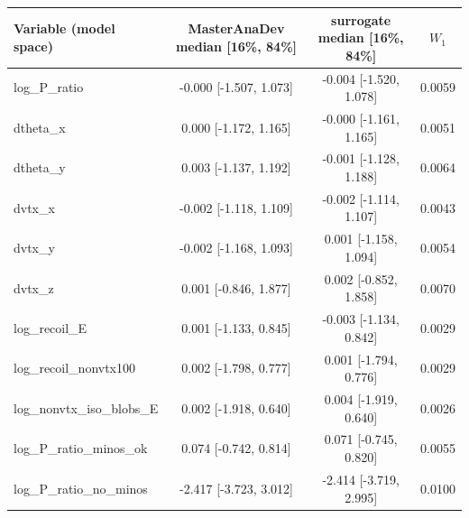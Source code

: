 \begin{tabular}{lccc}
\toprule
Variable (model space) & MasterAnaDev median [16\%, 84\%] & surrogate median [16\%, 84\%] & $W_1$ \\
\midrule
log\_P\_ratio & -0.000 [-1.507, 1.073] & -0.004 [-1.520, 1.078] & 0.0059 \\
dtheta\_x & 0.000 [-1.172, 1.165] & -0.000 [-1.161, 1.165] & 0.0051 \\
dtheta\_y & 0.003 [-1.137, 1.192] & -0.001 [-1.128, 1.188] & 0.0064 \\
dvtx\_x & -0.002 [-1.118, 1.109] & -0.002 [-1.114, 1.107] & 0.0043 \\
dvtx\_y & -0.002 [-1.168, 1.093] & 0.001 [-1.158, 1.094] & 0.0054 \\
dvtx\_z & 0.001 [-0.846, 1.877] & 0.002 [-0.852, 1.858] & 0.0070 \\
log\_recoil\_E & 0.001 [-1.133, 0.845] & -0.003 [-1.134, 0.842] & 0.0029 \\
log\_recoil\_nonvtx100 & 0.002 [-1.798, 0.777] & 0.001 [-1.794, 0.776] & 0.0029 \\
log\_nonvtx\_iso\_blobs\_E & 0.002 [-1.918, 0.640] & 0.004 [-1.919, 0.640] & 0.0026 \\
log\_P\_ratio\_minos\_ok & 0.074 [-0.742, 0.814] & 0.071 [-0.745, 0.820] & 0.0055 \\
log\_P\_ratio\_no\_minos & -2.417 [-3.723, 3.012] & -2.414 [-3.719, 2.995] & 0.0100 \\
\bottomrule
\end{tabular}
